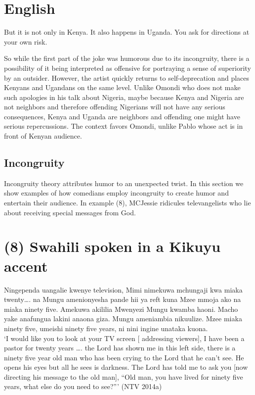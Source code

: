 \documentclass[output=paper]{langsci/langscibook}
\begin{document}
\chapter{English}
\gll But it is not only in Kenya. It also happens in Uganda. You ask for directions at your own risk. \\
\glt \citep{Omogi2012d}
\z

 So while the first part of the joke was humorous due to its incongruity, there is a possibility of it being interpreted as offensive for portraying a sense of superiority by an outsider. However, the artist quickly returns to self-deprecation and places Kenyans and Ugandans on the same level. Unlike Omondi who does not make such apologies in his talk about Nigeria, maybe because Kenya and Nigeria are not neighbors and therefore offending Nigerians will not have any serious consequences, Kenya and Uganda are neighbors and offending one might have serious repercussions. The context favors Omondi, unlike Pablo whose act is in front of Kenyan audience.

\section{Incongruity}

   Incongruity theory attributes humor to an unexpected twist. In this section we show examples of how comedians employ incongruity to create humor and entertain their audience. In example (8), MCJessie ridicules televangelists who lie about receiving special messages from God.

\chapter[(8) Swahili spoken in a Kikuyu accent ]{(8) Swahili spoken in a Kikuyu accent }
\gll Ningependa uangalie kwenye television, Mimi nimekuwa mchungaji kwa miaka twenty…. na Mungu amenionyesha pande hii ya reft kuna Mzee mmoja ako na miaka ninety five. Amekuwa akililia Mwenyezi Mungu kwamba haoni. Macho yake anafungua lakini anaona giza. Mungu ameniambia nikuulize. Mzee miaka ninety five, umeishi ninety five years, ni nini ingine unataka kuona.\\
\glt ‘I would like you to look at your TV screen [ addressing viewers], I have been a pastor for twenty years …. the Lord has shown me in this left side, there is a ninety five year old man who has been crying to the Lord that he can’t see. He opens his eyes but all he sees is darkness. The Lord has told me to ask you [now directing his message to the old man], “Old man, you have lived for ninety five years, what else do you need to see?”’  (NTV 2014a)
\z
\end{document}
